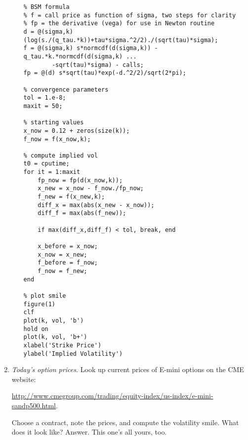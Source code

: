 \documentclass[11pt]{article}
\begin{document}
\begin{enumerate}
\begin{enumerate}
\begin{verbatim}
% BSM formula
% f = call price as function of sigma, two steps for clarity
% fp = the derivative (vega) for use in Newton routine
d = @(sigma,k) (log(s./(q_tau.*k))+tau*sigma.^2/2)./(sqrt(tau)*sigma);
f = @(sigma,k) s*normcdf(d(sigma,k)) - q_tau.*k.*normcdf(d(sigma,k) ...
        -sqrt(tau)*sigma) - calls;
fp = @(d) s*sqrt(tau)*exp(-d.^2/2)/sqrt(2*pi);

% convergence parameters
tol = 1.e-8;
maxit = 50;

% starting values
x_now = 0.12 + zeros(size(k));
f_now = f(x_now,k);

% compute implied vol
t0 = cputime;
for it = 1:maxit
    fp_now = fp(d(x_now,k));
    x_new = x_now - f_now./fp_now;
    f_new = f(x_new,k);
    diff_x = max(abs(x_new - x_now));
    diff_f = max(abs(f_new));

    if max(diff_x,diff_f) < tol, break, end

    x_before = x_now;
    x_now = x_new;
    f_before = f_now;
    f_now = f_new;
end

% plot smile
figure(1)
clf
plot(k, vol, 'b')
hold on
plot(k, vol, 'b+')
xlabel('Strike Price')
ylabel('Implied Volatility')
\end{verbatim}
\end{enumerate}

\item {\it Today's option prices.\/}
Look up current prices of E-mini options
on the CME website:

{\small
\url{http://www.cmegroup.com/trading/equity-index/us-index/e-mini-sandp500.html}.
}

Choose a contract, note the prices, and compute the volatility smile.
What does it look like?
%
Answer.  This one's all yours, too.

\end{enumerate}



\end{document}
